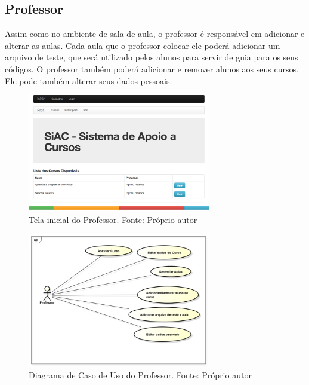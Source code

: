 \documentclass[pnumabnt,normaltoc,espacoumemeio,capchap]{abnt}
\begin{document}
\subsection{Professor}
\par Assim como no ambiente de sala de aula, o professor é responsável em adicionar e alterar as aulas. Cada aula que o professor colocar ele poderá adicionar um arquivo de teste, que será utilizado pelos alunos para servir de guia para os seus códigos. O professor também poderá adicionar e remover alunos aos seus cursos. Ele pode também alterar seus dados pessoais.
\begin{figure}[htbp]
	\centering
	\caption{Tela inicial do Professor\label{fig:tela-prof}. Fonte: Próprio autor}
	\includegraphics[width=8cm,scale=1]{images/tela-prof.png}
\end{figure}
\begin{figure}[htbp]
	\centering
	\caption{Diagrama de Caso de Uso do Professor\label{fig:dia-prof}. Fonte: Próprio autor}
	\includegraphics[width=8cm,scale=1]{images/dia-prof.png}
\end{figure}
 
\end{document}
